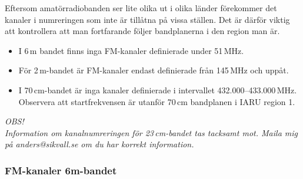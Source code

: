 Eftersom amatörradiobanden ser lite olika ut i olika länder förekommer det kanaler i numreringen som inte är tillåtna på vissa ställen. Det är därför viktig att kontrollera att man fortfarande följer bandplanerna i den region man är.

\begin{itemize}
\item I 6\,m bandet finns inga FM-kanaler definierade under 51\,MHz.
\item För 2\,m-bandet är FM-kanaler endast definierade från 145\,MHz och uppåt.
\item I 70\,cm-bandet är inga kanaler definierade i intervallet 432.000--433.000\,MHz. Observera att startfrekvensen är utanför 70\,cm bandplanen i IARU region 1.
\end{itemize}

\textit{OBS!\\ Information om kanalnumreringen för 23\,cm-bandet tas tacksamt mot. Maila mig på anders@sikvall.se om du har korrekt information.}

\clearpage
\subsubsection{FM-kanaler 6m-bandet}

